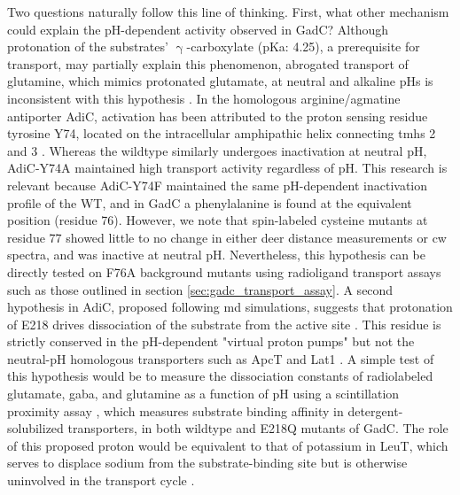 Two questions naturally follow this line of thinking. First, what other mechanism could explain the pH-dependent activity observed in GadC? Although protonation of the substrates' $\mathrm{\upgamma}$-carboxylate (pKa: 4.25), a prerequisite for transport, may partially explain this phenomenon, abrogated transport of glutamine, which mimics protonated glutamate, at neutral and alkaline pHs is inconsistent with this hypothesis \citep*{Ma2013}. In the homologous arginine/agmatine antiporter AdiC, activation has been attributed to the proton sensing residue tyrosine Y74, located on the intracellular amphipathic helix connecting \gls{tmh}s 2 and 3 \citep*{Wang2014}. Whereas the wildtype similarly undergoes inactivation at neutral pH, AdiC-Y74A maintained high transport activity regardless of pH. This research is relevant because AdiC-Y74F maintained the same pH-dependent inactivation profile of the WT, and in GadC a phenylalanine is found at the equivalent position (residue 76). However, we note that spin-labeled cysteine mutants at residue 77 showed little to no change in either \gls{deer} distance measurements or \gls{cw} spectra, and was inactive at neutral pH. Nevertheless, this hypothesis can be directly tested on F76A background mutants using radioligand transport assays such as those outlined in section \ref{sec:gadc_transport_assay}. A second hypothesis in AdiC, proposed following \gls{md} simulations, suggests that protonation of E218 drives dissociation of the substrate from the active site \citep*{Zomot2011}. This residue is strictly conserved in the pH-dependent "virtual proton pumps" but not the neutral-pH homologous transporters such as ApcT and Lat1 \citep*{Ma2012}. A simple test of this hypothesis would be to measure the dissociation constants of radiolabeled glutamate, \gls{gaba}, and glutamine as a function of pH using a scintillation proximity assay \citep*{Quick2007}, which measures substrate binding affinity in detergent-solubilized transporters, in both wildtype and E218Q mutants of GadC. The role of this proposed proton would be equivalent to that of potassium in LeuT, which serves to displace sodium from the substrate-binding site but is otherwise uninvolved in the transport cycle \citep*{Billesbølle2016}.

